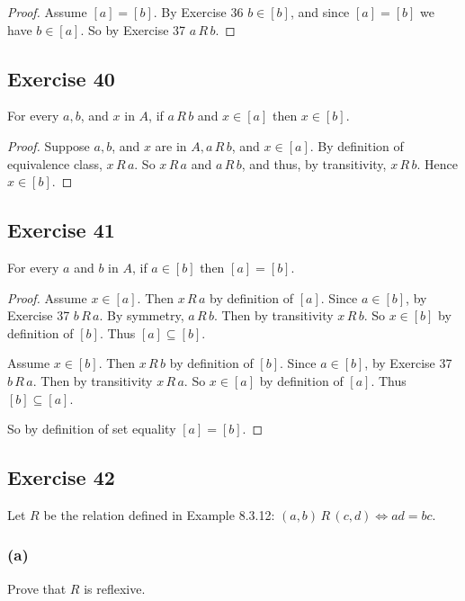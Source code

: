 \documentclass[14pt]{extarticle}
\begin{document}
\begin{proof}
        Assume \([a] = [b]\). By Exercise 36 \(b \in [b]\), and since \([a] = [b]\) we have \(b \in [a]\). So by Exercise
        37 \(a \,R\, b\).
\end{proof}

\subsection{Exercise 40}
For every \(a, b\), and \(x\) in \(A\), if \(a \,R\, b\) and \(x \in [a]\) then \(x \in [b]\).

\begin{proof}
        Suppose \(a, b\), and \(x\) are in \(A, a \,R\, b\), and \(x \in [a]\). By definition of equivalence class,
        \(x \,R\, a\). So \(x \,R\, a\) and \(a \,R\, b\), and thus, by transitivity, \(x \,R\, b\). Hence \(x \in [b]\).
\end{proof}

\subsection{Exercise 41}
For every $a$ and $b$ in $A$, if \(a \in [b]\) then \([a] = [b]\).

\begin{proof}
        Assume \(x \in [a]\). Then \(x \,R\, a\) by definition of \([a]\). Since \(a \in [b]\), by Exercise 37 \(b \,R\, a\).
        By symmetry, \(a \,R\, b\). Then by transitivity \(x \,R\, b\). So \(x \in [b]\) by definition of \([b]\). Thus
        \([a] \subseteq [b]\).

        Assume \(x \in [b]\). Then \(x \,R\, b\) by definition of \([b]\). Since \(a \in [b]\), by Exercise 37 \(b \,R\, a\).
        Then by transitivity \(x \,R\, a\). So \(x \in [a]\) by definition of \([a]\). Thus \([b] \subseteq [a]\).

        So by definition of set equality \([a] = [b]\).
\end{proof}

\subsection{Exercise 42}
Let $R$ be the relation defined in Example 8.3.12: \((a,b) \,R\, (c,d) \iff ad = bc\).

\subsubsection{(a)}
Prove that $R$ is reflexive.
\end{document}
